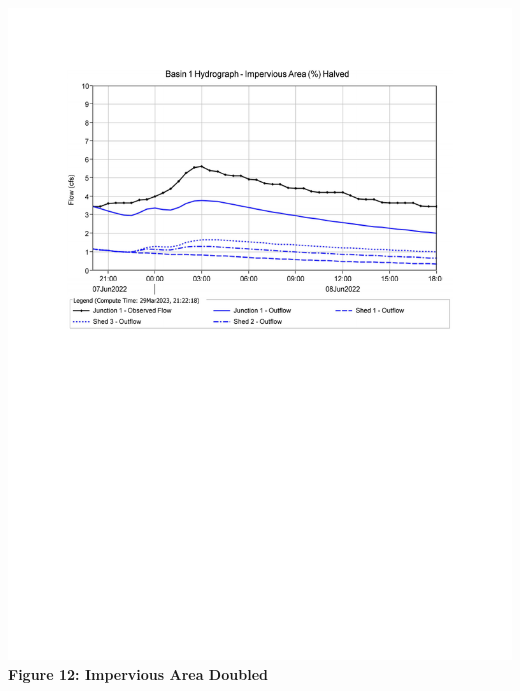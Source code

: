 \documentclass{article}
\begin{document}
\begin{center}
    \includegraphics*[scale=0.7, trim = {0 13cm 0 3.1cm}]{results/Basin_1_Hydrograph_-_Impervious_Area_Halved.pdf}
    \vspace{5mm}
    {\large{\bf \\Figure 12: Impervious Area Doubled\\}}

\end{center}
\end{document}
